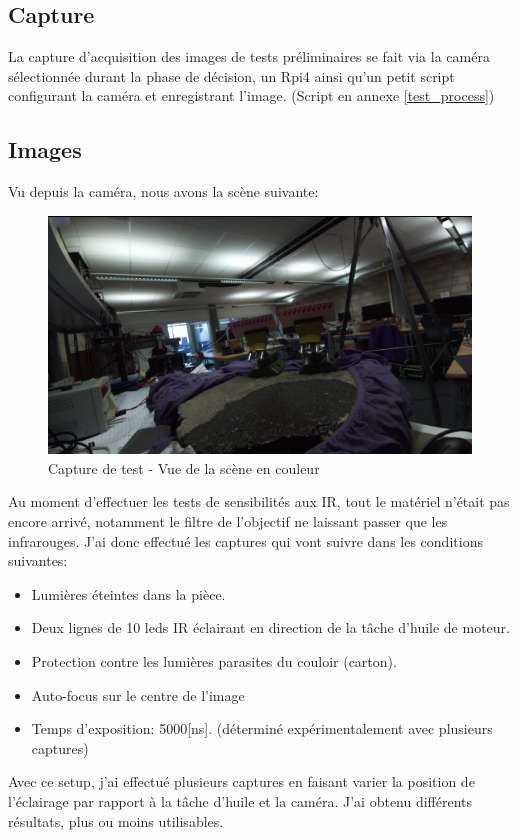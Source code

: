 \subsection{Capture}
La capture d'acquisition des images de tests préliminaires se fait via la caméra sélectionnée durant la phase de décision, un Rpi4 ainsi
qu'un petit script configurant la caméra et enregistrant l'image. (Script en annexe \ref{test_process})
\subsection{Images}
Vu depuis la caméra, nous avons la scène suivante:

\begin{figure}[H]
    \centering
    \includegraphics[width=13cm]{assets/figures/camera_vue_couleur1.png}
    \caption{Capture de test - Vue de la scène en couleur}
\end{figure}

Au moment d'effectuer les tests de sensibilités aux IR, tout le matériel n'était pas encore arrivé, notamment le filtre de l'objectif ne
laissant passer que les infrarouges. J'ai donc effectué les captures qui vont suivre dans les conditions suivantes:
\begin{itemize}
    \item Lumières éteintes dans la pièce.
    \item Deux lignes de 10 leds IR éclairant en direction de la tâche d'huile de moteur.
    \item Protection contre les lumières parasites du couloir (carton).
    \item Auto-focus sur le centre de l'image
    \item Temps d'exposition: 5000[ns]. (déterminé expérimentalement avec plusieurs captures)
\end{itemize}
Avec ce setup, j'ai effectué plusieurs captures en faisant varier la position de l'éclairage par rapport à la tâche d'huile et la caméra.
J'ai obtenu différents résultats, plus ou moins utilisables.


